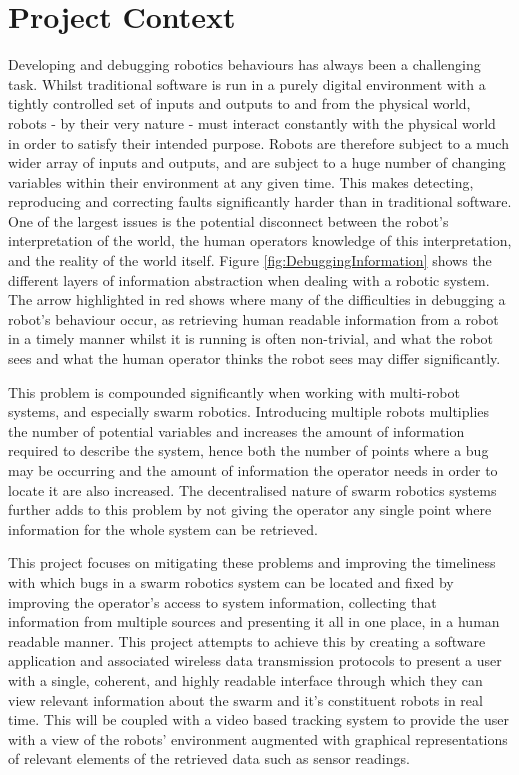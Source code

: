 
\section{Project Context}
Developing and debugging robotics behaviours has always been a challenging task. Whilst traditional software is run in a purely digital environment with a tightly controlled set of inputs and outputs to and from the physical world, robots - by their very nature - must interact constantly with the physical world in order to satisfy their intended purpose. Robots are therefore subject to a much wider array of inputs and outputs, and are subject to a huge number of changing variables within their environment at any given time. This makes detecting, reproducing and correcting faults significantly harder than in traditional software. One of the largest issues is the potential disconnect between the robot's interpretation of the world, the human operators knowledge of this interpretation, and the reality of the world itself. Figure \ref{fig:DebuggingInformation} shows the different layers of information abstraction when dealing with a robotic system. The arrow highlighted in red shows where many of the difficulties in debugging a robot's behaviour occur, as retrieving human readable information from a robot in a timely manner whilst it is running is often non-trivial, and what the robot sees and what the human operator thinks the robot sees may differ significantly.

This problem is compounded significantly when working with multi-robot systems, and especially swarm robotics. Introducing multiple robots multiplies the number of potential variables and increases the amount of information required to describe the system, hence both the number of points where a bug may be occurring and the amount of information the operator needs in order to locate it are also increased. The decentralised nature of swarm robotics systems further adds to this problem by not giving the operator any single point where information for the whole system can be retrieved.

This project focuses on mitigating these problems and improving the timeliness with which bugs in a swarm robotics system can be located and fixed by improving the operator's access to system information, collecting that information from multiple sources and presenting it all in one place, in a human readable manner. This project attempts to achieve this by creating a software application and associated wireless data transmission protocols to present a user with a single, coherent, and highly readable interface through which they can view relevant information about the swarm and it's constituent robots in real time. This will be coupled with a video based tracking system to provide the user with a view of the robots' environment augmented with graphical representations of relevant elements of the retrieved data such as sensor readings.

